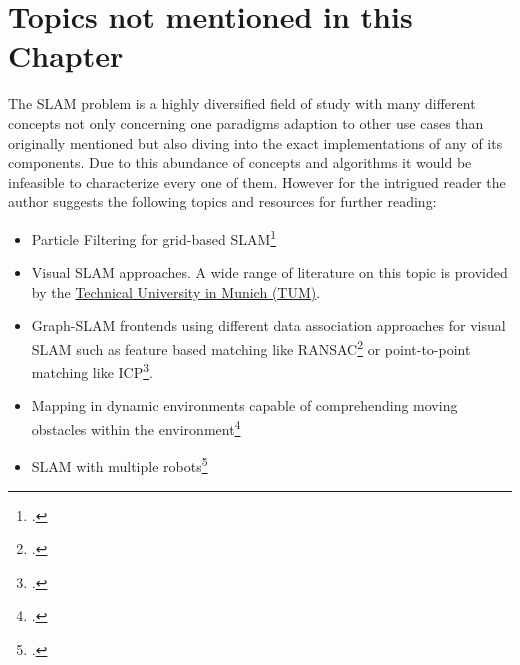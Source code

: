 \section{Topics not mentioned in this Chapter}
The SLAM problem is a highly diversified field of study with many different concepts not only concerning one paradigms adaption to other use cases than originally mentioned but also diving into the exact implementations of any of its components. Due to this abundance of concepts and algorithms it would be infeasible to characterize every one of them. 
However for the intrigued reader the author suggests the following topics and resources for further reading:
\begin{itemize}
	\item Particle Filtering for grid-based SLAM\footcite{grisetti2005ParticleGrid}
	\item Visual SLAM approaches. A wide range of literature on this topic is provided by the \href{https://vision.in.tum.de/research/vslam}{Technical University in Munich (TUM)}.
	\item Graph-SLAM frontends using different data association approaches for visual SLAM such as feature based matching like RANSAC\footcite{Jia2018FeatureMatching} or point-to-point matching like ICP\footcite{Horn1988ICP}. 
	\item Mapping in dynamic environments capable of comprehending moving obstacles within the environment\footcite{wang2003dynSLAM}
	\item SLAM with multiple robots\footcite{gutmann2003IncrMapping}
\end{itemize} 




\filbreak